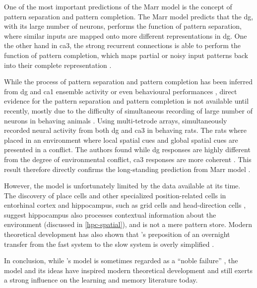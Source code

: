 One of the most important predictions of the Marr model \citep{marr71} is the concept of pattern separation and pattern completion. The Marr model predicts that the \gls{dg}, with its large number of neurons, performs the function of pattern separation, where similar inputs are mapped onto more different representations in \gls{dg}. One the other hand in \gls{ca3}, the strong recurrent connections is able to perform the function of pattern completion, which maps partial or noisy input patterns back into their complete representation \citep{rolls13, knierim16}. 

While the process of pattern separation and pattern completion has been inferred from \gls{dg} and \gls{ca1} ensemble activity or even behavioural performances \citep{santoro13, rolls13}, direct evidence for the pattern separation and pattern completion is not available until recently, mostly due to the difficulty of simultaneous recording of large number of neurons in behaving animals \citep{knierim16}. Using multi-tetrode arrays, \citet{neunuebel14} simultaneously recorded neural activity from both \gls{dg} and \gls{ca3} in behaving rats. The rats where placed in an environment where local spatial cues and global spatial cues are presented in a conflict. The authors found while \gls{dg} responses are highly different from the degree of environmental conflict, \gls{ca3} responses are more coherent \citep{neunuebel14}. This result therefore directly confirms the long-standing prediction from Marr model \cite{rolls13, knierim16}. 

However, the \citet{marr71} model is unfortunately limited by the data available at its time. The discovery of place cells \citep{o'keefe71} and other specialized position-related cells in entorhinal cortex and hippocampus, such as grid cells and head-direction cells \citep{taube90, fyhn04, hafting05}, suggest hippocampus also processes contextual information about the environment (discussed in \ref{hpc-spatial}), and is not a mere pattern store. Modern theoretical development has also shown that \citet{marr71}'s preposition of an overnight transfer from the fast system to the slow system is overly simplified \citep{squire09}. 

In conclusion, while \citet{marr71}'s model is sometimes regarded as a ``noble failure'' \citep{willshaw15}, the model and its ideas have inspired modern theoretical development and still exerts a strong influence on the learning and memory literature today. 


